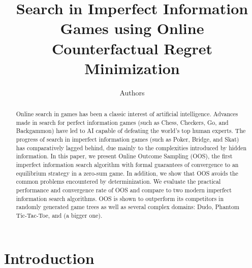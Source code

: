 \documentclass[letterpaper]{article}
\begin{document}
%
\title{Search in Imperfect Information Games using Online\\Counterfactual Regret Minimization}
\author{Authors}


\maketitle

\begin{abstract}
Online search in games has been a classic interest of artificial intelligence.
Advances made in search for perfect information games (such as Chess, Checkers, Go, and Backgammon) have led to AI capable of defeating the world's top human experts. 
The progress of search in imperfect information games (such as Poker, Bridge, and Skat) has comparatively lagged behind, due mainly to the complexities introduced by hidden information. 
In this paper, we present Online Outcome Sampling (OOS), the first imperfect information search algorithm with formal guarantees of convergence to an equilibrium strategy in a zero-sum game.   
In addition, we show that OOS avoids the common problems encountered by determinization.
We evaluate the practical performance and convergence rate of OOS and compare to two modern imperfect information search algorithms.
OOS is shown to outperform its competitors in randomly generated game trees as well as several complex domains: 
Dudo, Phantom Tic-Tac-Toe, and (a bigger one). 
\end{abstract}

\section{Introduction}

\end{document}
